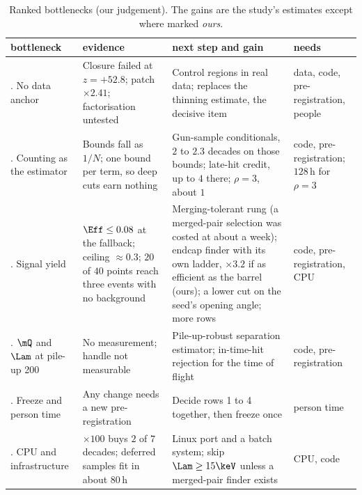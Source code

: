 \begin{table}
  \caption{Ranked bottlenecks (our judgement). The gains are the study's estimates except where marked \emph{ours}.}
  \label{tab:28-rank}
  \footnotesize\setlength{\tabcolsep}{4pt}
  \begin{tabular}{@{}>{\raggedright\arraybackslash}p{19mm}>{\raggedright\arraybackslash}p{28mm}>{\raggedright\arraybackslash}p{38mm}>{\raggedright\arraybackslash}p{18mm}@{}}
    \toprule
    bottleneck & evidence & next step and gain & needs\\
    \midrule
    1. No data anchor & Closure failed at $z=+52.8$; patch $\times2.41$; factorisation untested & Control regions in real data; replaces the thinning estimate, the decisive item & data, code, pre-registration, people\\
    \addlinespace
    2. Counting as the estimator & Bounds fall as $1/N$; one bound per term, so deep cuts earn nothing & Gun-sample conditionals, $2$ to $2.3$ decades on those bounds; late-hit credit, up to $4$ there; $\rho=3$, about $1$ & code, pre-registration; $128$\,h for $\rho=3$\\
    \addlinespace
    3. Signal yield & $\Eff\le0.08$ at the fallback; ceiling $\approx0.3$; $20$ of $40$ points reach three events with no background & Merging-tolerant rung (a merged-pair selection was costed at about a week); endcap finder with its own ladder, $\times3.2$ if as efficient as the barrel (ours); a lower cut on the seed's opening angle; more rows & code, pre-registration, CPU\\
    \addlinespace
    4. $\mQ$ and $\Lam$ at pile-up 200 & No measurement; handle not measurable & Pile-up-robust separation estimator; in-time-hit rejection for the time of flight & code, pre-registration\\
    \addlinespace
    5. Freeze and person time & Any change needs a new pre-registration & Decide rows 1 to 4 together, then freeze once & person time\\
    \addlinespace
    6. CPU and infrastructure & $\times100$ buys $2$ of $7$ decades; deferred samples fit in about $80$\,h & Linux port and a batch system; skip $\Lam\ge15\keV$ unless a merged-pair finder exists & CPU, code\\
    \bottomrule
  \end{tabular}
\end{table}

